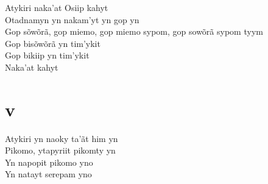 \begin{linenumbers}\begingroup\raggedright
 
\noindent   Atykiri naka'at Osiip kahyt\\
  Otadnamyn yn nakam'yt yn gop yn\\
  Gop sõwõrã, gop miemo, gop miemo sypom, gop sowõrã sypom tyym\\
  Gop bisõwõrã yn tim'ykit\\
  Gop bikiip yn tim'ykit\\
  Naka'at kahyt
 
 
\medskip
\section{v}

  \noindent Atykiri yn naoky ta'ãt him yn\\
  Pikomo, ytapyriit pikomty yn\\
  Yn napopit pikomo yno\\
  Yn natayt serepam yno
 
\end{linenumbers}\endgroup

\bigskip

